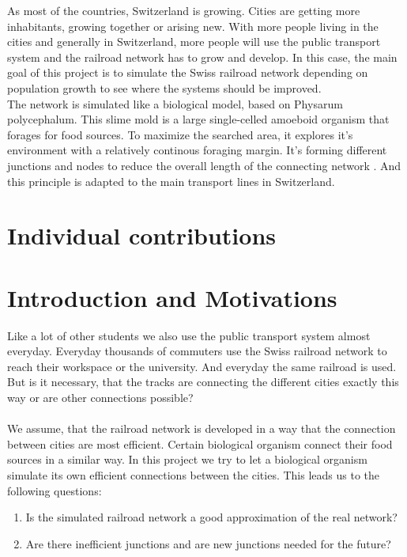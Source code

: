 \documentclass[11pt]{article}
\begin{document}
As most of the countries, Switzerland is growing. Cities are getting more inhabitants, growing together or arising new. With more people living in the cities and generally in Switzerland, more people will use the public transport system and the railroad network has to grow and develop. In this case, the main goal of this project is to simulate the Swiss railroad network depending on population growth to see where the systems should be improved.~\\
The network is simulated like a biological model, based on Physarum polycephalum. This slime mold is a large single-celled amoeboid organism that forages for food sources. To maximize the searched area, it explores it's environment with a relatively continous foraging margin. It's forming different junctions and nodes to reduce the overall length of the connecting network \cite{network_tokyo}. And this principle is adapted to the main transport lines in Switzerland.

 


\section{Individual contributions}



\section{Introduction and Motivations}
Like a lot of other students we also use the public transport system almost everyday. Everyday thousands of commuters use the Swiss railroad network to reach their workspace or the university. And everyday the same railroad is used. But is it necessary, that the tracks are connecting the different cities exactly this way or are other connections possible?~\\
~\\
We assume, that the railroad network is developed in a way that the connection between cities are most efficient. Certain biological organism connect their food sources in a similar way. In this project we try to let a biological organism simulate its own efficient connections between the cities. This leads us to the following questions:

\begin{enumerate}
	\item Is the simulated railroad network a good approximation of the real network?
	\item Are there inefficient junctions and are new junctions needed for the future?
\end{enumerate}
\end{document}
